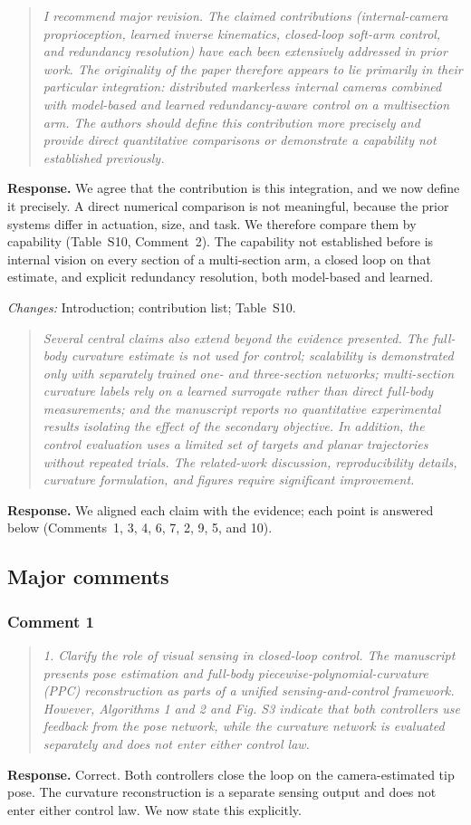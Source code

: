 \documentclass[11pt,a4paper]{article}
\newcommand{\rc}[1]{\begin{quote}\color{black!70}\itshape #1\end{quote}}
\begin{document}
\rc{I recommend major revision. The claimed contributions (internal-camera proprioception, learned inverse kinematics, closed-loop soft-arm control, and redundancy resolution) have each been extensively addressed in prior work. The originality of the paper therefore appears to lie primarily in their particular integration: distributed markerless internal cameras combined with model-based and learned redundancy-aware control on a multisection arm. The authors should define this contribution more precisely and provide direct quantitative comparisons or demonstrate a capability not established previously.}
\textbf{Response.} We agree that the contribution is this integration, and we now define it precisely. A direct numerical comparison is not meaningful, because the prior systems differ in actuation, size, and task. We therefore compare them by capability (Table~S10, Comment~2). The capability not established before is internal vision on every section of a multi-section arm, a closed loop on that estimate, and explicit redundancy resolution, both model-based and learned.

\textit{Changes:} Introduction; contribution list; Table~S10.

\rc{Several central claims also extend beyond the evidence presented. The full-body curvature estimate is not used for control; scalability is demonstrated only with separately trained one- and three-section networks; multi-section curvature labels rely on a learned surrogate rather than direct full-body measurements; and the manuscript reports no quantitative experimental results isolating the effect of the secondary objective. In addition, the control evaluation uses a limited set of targets and planar trajectories without repeated trials. The related-work discussion, reproducibility details, curvature formulation, and figures require significant improvement.}
\textbf{Response.} We aligned each claim with the evidence; each point is answered below (Comments~1, 3, 4, 6, 7, 2, 9, 5, and 10).

\subsection*{Major comments}

\subsubsection*{Comment 1}

\rc{1. Clarify the role of visual sensing in closed-loop control. The manuscript presents pose estimation and full-body piecewise-polynomial-curvature (PPC) reconstruction as parts of a unified sensing-and-control framework. However, Algorithms 1 and 2 and Fig. S3 indicate that both controllers use feedback from the pose network, while the curvature network is evaluated separately and does not enter either control law.}
\textbf{Response.} Correct. Both controllers close the loop on the camera-estimated tip pose. The curvature reconstruction is a separate sensing output and does not enter either control law. We now state this explicitly.
\end{document}

